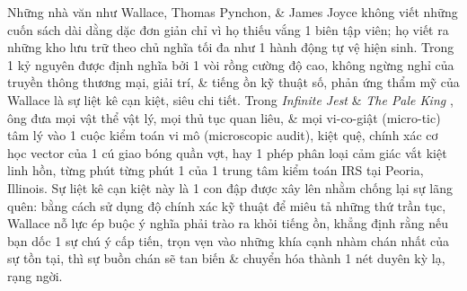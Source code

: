 \documentclass[11pt]{article}
\begin{document}
Những nhà văn như Wallace, Thomas Pynchon, \& James Joyce không viết những cuốn sách dài dằng dặc đơn giản chỉ vì họ thiếu vắng 1 biên tập viên; họ viết ra những kho lưu trữ theo chủ nghĩa tối đa như 1 hành động tự vệ hiện sinh. Trong 1 kỷ nguyên được định nghĩa bởi 1 vòi rồng cường độ cao, không ngừng nghỉ của truyền thông thương mại, giải trí, \& tiếng ồn kỹ thuật số, phản ứng thẩm mỹ của Wallace là sự liệt kê cạn kiệt, siêu chi tiết. Trong \textit{Infinite Jest} \cite{Wallace_jest} \& \textit{The Pale King} \cite{wallace2011pale}, ông đưa mọi vật thể vật lý, mọi thủ tục quan liêu, \& mọi vi-co-giật (micro-tic) tâm lý vào 1 cuộc kiểm toán vi mô (microscopic audit), kiệt quệ, chính xác cơ học vector của 1 cú giao bóng quần vợt, hay 1 phép phân loại cảm giác vắt kiệt linh hồn, từng phút từng phút 1 của 1 trung tâm kiểm toán IRS tại Peoria, Illinois. Sự liệt kê cạn kiệt này là 1 con đập được xây lên nhằm chống lại sự lãng quên: bằng cách sử dụng độ chính xác kỹ thuật để miêu tả những thứ trần tục, Wallace nỗ lực ép buộc ý nghĩa phải trào ra khỏi tiếng ồn, khẳng định rằng nếu bạn dốc 1 sự chú ý cấp tiến, trọn vẹn vào những khía cạnh nhàm chán nhất của sự tồn tại, thì sự buồn chán sẽ tan biến \& chuyển hóa thành 1 nét duyên kỳ lạ, rạng ngời.
\end{document}
